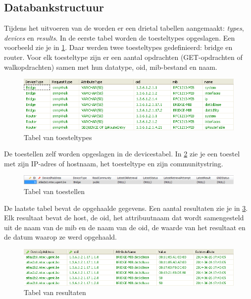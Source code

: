 \subsection{Databankstructuur}
\label{snmp-data-retriever-db}
Tijdens het uitvoeren van de \nwmretriever{} worden er een drietal tabellen aangemaakt: \textit{types}, \textit{devices} en \textit{results}.
In de eerste tabel worden de toesteltypes opgeslagen.
Een voorbeeld zie je in \cref{fig-db-types}.
Daar werden twee toesteltypes gedefinieerd: bridge en router.
Voor elk toesteltype zijn er een aantal opdrachten (GET-opdrachten of walkopdrachten) samen met hun datatype, \gls{oid}, \gls{mib}-bestand en naam.

\begin{figure}[h]
	\centering
	\includegraphics[scale=0.50]{figures/database/types}
	\caption{Tabel van toesteltypes}
	\label{fig-db-types}
\end{figure}

De toestellen zelf worden opgeslagen in de devicestabel.
In \cref{fig-db-devices} zie je een toestel met zijn IP-adres of hostnaam, het toesteltype en zijn communitystring.

\begin{figure}[h]
	\centering
	\includegraphics[scale=0.40]{figures/database/devices}
	\caption{Tabel van toestellen}
	\label{fig-db-devices}
\end{figure}

De laatste tabel bevat de opgehaalde gegevens.
Een aantal resultaten zie je in \cref{fig-db-results}.
Elk resultaat bevat de host, de \gls{oid}, het attribuutnaam dat wordt samengesteld uit de naam van de \gls{mib} en de naam van de \gls{oid},
de waarde van het resultaat en de datum waarop ze werd opgehaald.

\begin{figure}[h]
	\centering
	\includegraphics[scale=0.50]{figures/database/results}
	\caption{Tabel van resultaten}
	\label{fig-db-results}
\end{figure}



